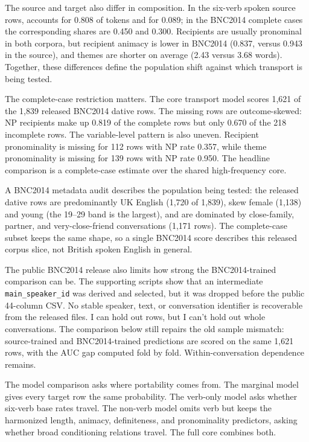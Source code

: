 The source and target also differ in composition. In the six-verb spoken source
rows,  accounts for 0.808 of tokens and  for 0.089;
in the BNC2014 complete cases the corresponding shares are 0.450 and 0.300.
Recipients are usually pronominal in both corpora, but recipient animacy is
lower in BNC2014 (0.837, versus 0.943 in the source), and themes are shorter on
average (2.43 versus 3.68 words). Together, these differences define the
population shift against which transport is being tested.

The complete-case restriction matters. The core transport model scores 1,621 of
the 1,839 released BNC2014 dative rows. The missing rows are outcome-skewed: NP
recipients make up 0.819 of the complete rows but only 0.670 of the 218
incomplete rows. The variable-level pattern is also uneven.
Recipient pronominality is missing for 112 rows with NP rate 0.357, while theme
pronominality is missing for 139 rows with NP rate 0.950. The headline
comparison is a complete-case estimate over the shared high-frequency core.

A BNC2014 metadata audit describes the population being tested: the released
dative rows are predominantly UK English (1,720 of 1,839), skew female (1,138)
and young (the 19--29 band is the largest), and are dominated by close-family,
partner, and very-close-friend conversations (1,171 rows). The complete-case
subset keeps the same shape, so a single BNC2014 score describes this released
corpus slice, not British spoken English in general.

The public BNC2014 release also limits how strong the BNC2014-trained comparison
can be. The supporting scripts show that an intermediate
\texttt{main\_speaker\_id} was derived and selected, but it was dropped before
the public 44-column CSV. No stable speaker, text, or conversation identifier is
recoverable from the released files. I can hold out rows, but I can't hold out
whole conversations. The comparison below still repairs the old sample mismatch:
source-trained and BNC2014-trained predictions are scored on the same 1,621
rows, with the AUC gap computed fold by fold. Within-conversation dependence
remains.

The model comparison asks where portability comes from. The marginal model gives
every target row the same probability. The verb-only model asks whether six-verb
base rates travel. The non-verb model omits verb but keeps the harmonized length,
animacy, definiteness, and pronominality predictors, asking whether broad
conditioning relations travel. The full core combines both.

